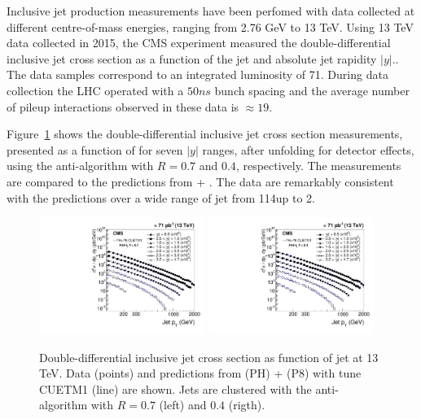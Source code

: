 \documentclass{PoS}
\begin{document}
Inclusive jet production measurements have been perfomed with data collected at different centre-of-mass energies, ranging from 2.76 GeV to 13 TeV. 
Using 13 TeV data collected in 2015, the CMS experiment measured the double-differential inclusive jet
cross section as a function of the jet \pt and absolute jet rapidity $|y|$.\cite{Khachatryan:2016wdh}. The data samples correspond to
an integrated luminosity of 71\pbinv. During data collection the LHC operated with a $50\unit{ns}$ bunch spacing and the
average number of pileup interactions observed in these data is ${\approx}19$. 

Figure~\ref{fig:crossSection} shows the double-differential inclusive jet cross section measurements,
presented as a function of \pt for seven $|y|$ ranges, after
unfolding for detector effects, using the anti-\kts algorithm with $R =
0.7$ and $0.4$, respectively. The measurements are compared to the predictions from \POWHEG +
\PYTHIA. The data are remarkably consistent with the predictions over a wide range of jet \pt from 114\GeV up to
2\TeV.

\begin{figure}[htbp] \centering
  \includegraphics[width=0.48\textwidth]{Figure1-a.pdf}
  \includegraphics[width=0.48\textwidth]{Figure1-b.pdf}
  \caption{Double-differential inclusive jet cross section as function of jet \pt at 13 TeV. Data (points) and
predictions from \POWHEG (PH) + \PYTHIA (P8) with tune CUETM1 (line) are shown. Jets are clustered with the anti-\kts
algorithm with $R = 0.7$ (left) and $0.4$ (rigth).}
  \label{fig:crossSection}
\end{figure}
\end{document}
